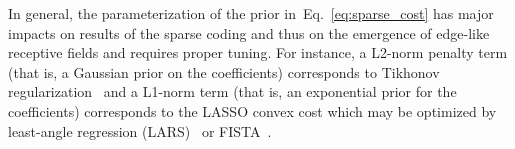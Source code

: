 \documentclass[vision,article,submit,oneauthor,pdftex]{Definitions/mdpi}
\newcommand{\coef}{\mathbf{a}} %
\newcommand{\image}{\mathbf{y}} %
\newcommand{\dico}{\Phi} %
\newcommand{\seeEq}[1]{Eq.~\ref{eq:#1}}%
\begin{document}
In general, the parameterization of the prior in~\seeEq{sparse_cost} has major impacts on results of the sparse coding and thus on the emergence of edge-like receptive fields and requires proper tuning. For instance, a L2-norm penalty term (that is, a Gaussian prior on the coefficients) corresponds to Tikhonov regularization~\citep{Tikhonov77} and a L1-norm term (that is, an exponential prior for the coefficients) corresponds to the LASSO convex cost which may be optimized by least-angle regression (LARS)~\citep{efron2004least} or FISTA~\citep{beck2009fast}. %
\end{document}
